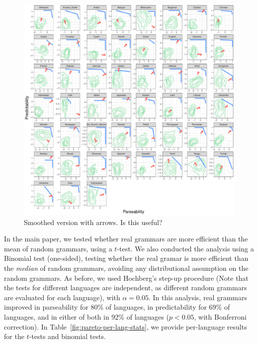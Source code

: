 \documentclass[10pt,twoside,lineno]{article}
\begin{document}
\begin{figure}
\centering
\includegraphics[width=\textwidth]{../results/plane/pareto-plane-perLanguage-arrows-smoothed.pdf}
\caption[Predictability and Parseability]{Smoothed version with arrows. Is this useful?}\label{fig:pareto-per-lang-arrows}
\end{figure}






In the main paper, we tested whether real grammars are more efficient than the mean of random grammars, using a $t$-test.
We also conducted the analysis using a Binomial test (one-sided), testing whether the real gramar is more efficient than the \emph{median} of random grammars, avoiding any distributional assumption on the random grammars.
As before, we used Hochberg's step-up procedure (Note that the tests for different languages are independent, as different random grammars are evaluated for each language), with $\alpha=0.05$.
In this analysis, real grammars improved in parseability for 80\% of languages, in predictability for 69\% of languages, and in either of both in 92\% of languages ($p<0.05$, with Bonferroni correction).
In Table~\ref{fig:pareto-per-lang-stats}, we provide per-language results for the $t$-tests and binomial tests.
\end{document}
